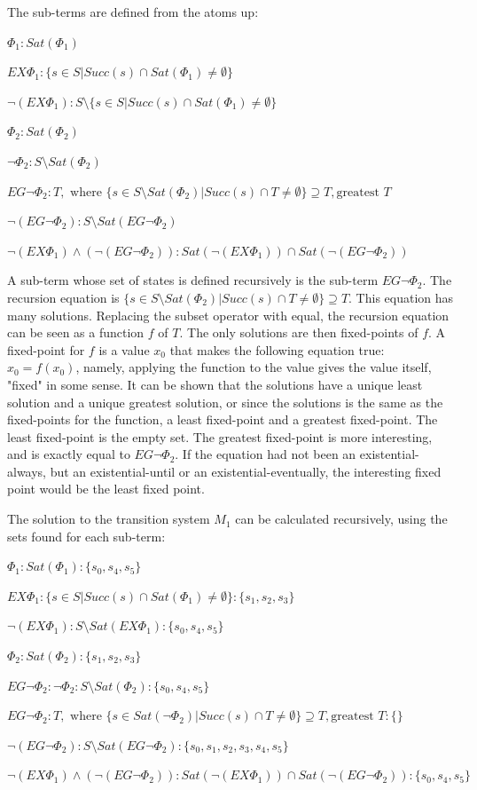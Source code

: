The sub-terms are defined from the atoms up:

$\Phi_1: Sat(\Phi_1)$

$EX \Phi_1: \{s \in S | Succ(s) \cap Sat(\Phi_1) \neq \emptyset\}$

$\neg (EX \Phi_1): S \setminus \{s \in S | Succ(s) \cap Sat(\Phi_1) \neq \emptyset\}$

$\Phi_2: Sat(\Phi_2)$

$\neg \Phi_2: S \setminus Sat(\Phi_2)$

$EG \neg \Phi_2: T, \text{    where } \{s \in S \setminus Sat(\Phi_2) | Succ(s) \cap T \neq \emptyset \} \supseteq T, \text{greatest } T$

$\neg (EG \neg \Phi_2): S \setminus Sat(EG \neg \Phi_2)$

$\neg (EX \Phi_1) \wedge (\neg (EG \neg \Phi_2)): Sat(\neg (EX \Phi_1)) \cap Sat(\neg (EG \neg \Phi_2))$

A sub-term whose set of states is defined recursively is the sub-term $EG \neg \Phi_2$.
The recursion equation is $\{s \in S \setminus Sat(\Phi_2) | Succ(s) \cap T \neq \emptyset \} \supseteq T$.
This equation has many solutions.
Replacing the subset operator with equal, the recursion equation can be seen as a function $f$ of $T$.
The only solutions are then fixed-points of $f$.
A fixed-point for $f$ is a value $x_0$ that makes the following equation true: $x_0 = f(x_0)$,
namely, applying the function to the value gives the value itself, "fixed" in some sense.
It can be shown that the solutions have a unique least solution and a unique greatest solution,
or since the solutions is the same as the fixed-points for the function, a least fixed-point and a greatest fixed-point.
The least fixed-point is the empty set.
The greatest fixed-point is more interesting, and is exactly equal to $EG \neg \Phi_2$.
If the equation had not been an existential-always, but an existential-until or
an existential-eventually, the interesting fixed point would be the least fixed point.

The solution to the transition system $M_1$ can be calculated recursively,
using the sets found for each sub-term:

$\Phi_1: Sat(\Phi_1): \{s_0, s_4, s_5\}$

$EX \Phi_1: \{s \in S | Succ(s) \cap Sat(\Phi_1) \neq \emptyset\}: \{s_1, s_2, s_3\}$

$\neg (EX \Phi_1): S \setminus Sat(EX \Phi_1): \{s_0, s_4, s_5\}$

$\Phi_2: Sat(\Phi_2): \{s_1, s_2, s_3\}$

$EG \neg \Phi_2: \neg \Phi_2: S \setminus Sat(\Phi_2): \{s_0, s_4, s_5\}$

$EG \neg \Phi_2: T, \text{    where } \{s \in Sat(\neg \Phi_2) | Succ(s) \cap T \neq \emptyset \} \supseteq T, \text{greatest } T: \{\}$

$\neg (EG \neg \Phi_2): S \setminus Sat(EG \neg \Phi_2): \{s_0, s_1, s_2, s_3, s_4, s_5\}$

$\neg (EX \Phi_1) \wedge (\neg (EG \neg \Phi_2)): Sat(\neg (EX \Phi_1)) \cap Sat(\neg (EG \neg \Phi_2)): \{s_0, s_4, s_5\}$

